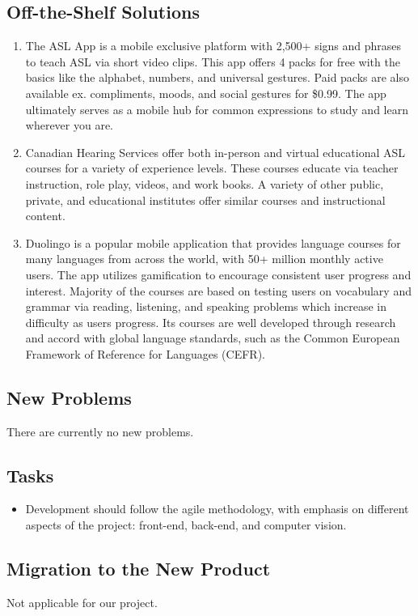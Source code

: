 \documentclass[12pt, titlepage]{article}
\begin{document}
\subsection{Off-the-Shelf Solutions}
\begin{enumerate}
    \item The ASL App is a mobile exclusive platform with 2,500+ signs and phrases to teach ASL via short video clips. This app offers 4 packs for free with the basics like the alphabet, numbers, and universal gestures. Paid packs are also available ex. compliments, moods, and social gestures for \$0.99. The app ultimately serves as a mobile hub for common expressions to study and learn wherever you are.
    \item Canadian Hearing Services offer both in-person and virtual educational ASL courses for a variety of experience levels. These courses educate via teacher instruction, role play, videos, and work books. A variety of other public, private, and educational institutes offer similar courses and instructional content.
    \item Duolingo is a popular mobile application that provides language courses for many languages from across the world, with 50+ million monthly active users. The app utilizes gamification to encourage consistent user progress and interest. Majority of the courses are based on testing users on vocabulary and grammar via reading, listening, and speaking problems which increase in difficulty as users progress. Its courses are well developed through research and accord with global language standards, such as the Common European Framework of Reference for Languages (CEFR).
\end{enumerate}

\subsection{New Problems}
There are currently no new problems.

\subsection{Tasks}
\begin{itemize}
    \item Development should follow the agile methodology, with emphasis on different aspects of the project: front-end, back-end, and computer vision.
\end{itemize}

\subsection{Migration to the New Product}
Not applicable for our project.
\end{document}
